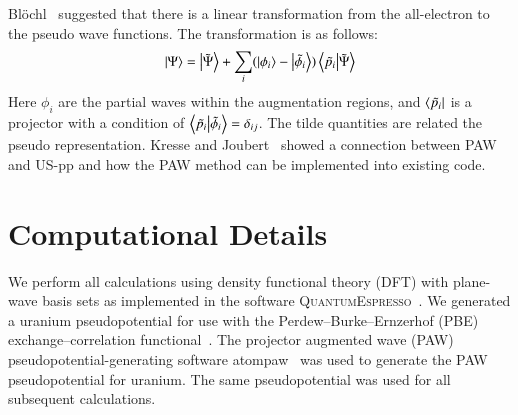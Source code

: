 Bl\"ochl~\cite{Bloechl1994} suggested that there is a linear transformation from the all-electron to the pseudo wave functions. The transformation is as follows:
\begin{equation}
\ket{\Psi} = \ket{\tilde{\Psi}} + \sum_i (\ket{\phi_i} - \ket{\tilde{\phi_i}})\braket{\tilde{p_i}}{\tilde{\Psi}}
\end{equation}
Here $\phi_i$ are the partial waves within the augmentation regions, and $\bra{\tilde{p_i}}$ is a projector with a condition of $\braket{\tilde{p_i}}{\tilde{\phi_i}} = \delta_{ij}$. The tilde quantities are related the pseudo representation. Kresse and Joubert~\cite{kresse1999ultrasoft} showed a connection between PAW and US-pp and how the PAW method can be implemented into existing code.




\section{Computational Details}\label{sec_comp}
We perform all calculations using density functional theory (DFT) with
plane-wave basis sets as implemented in the software
\textsc{QuantumEspresso}~\cite{giannozzi2009quantum}. We generated a uranium
pseudopotential for use with the Perdew--Burke--Ernzerhof (PBE)
exchange--correlation functional~\cite{Perdew1996b,Perdew1997}.
The projector augmented wave (PAW) pseudopotential-generating software
atompaw~\cite{holzwarth2001projector,tackett2001projector} was used to generate
the PAW pseudopotential for uranium. The same pseudopotential was used for all
subsequent calculations.

